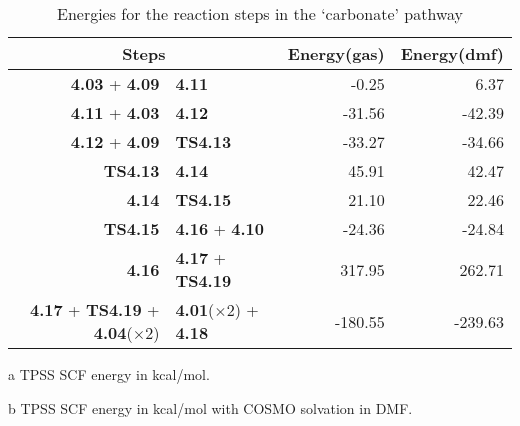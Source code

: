 \begin{table}[!htb]
\centering
 \begin{threeparttable}
  \caption{Energies for the reaction steps in the `carbonate' pathway}
    \begin{tabular}{r@{ $\rightarrow$ }lrr}
    \toprule
    \multicolumn{2}{c}{Steps} & Energy(gas)\tnote{a} & Energy(dmf)\tnote{b} \\
    \midrule
    \textbf{4.03} + \textbf{4.09} & \textbf{4.11} & -0.25 & 6.37 \\
    \textbf{4.11} + \textbf{4.03} & \textbf{4.12} & -31.56 & -42.39 \\
    \textbf{4.12} + \textbf{4.09} & \textbf{TS4.13} & -33.27 & -34.66 \\
    \textbf{TS4.13} & \textbf{4.14} & 45.91 & 42.47 \\
    \textbf{4.14} & \textbf{TS4.15} & 21.10 & 22.46 \\
    \textbf{TS4.15} & \textbf{4.16} + \textbf{4.10} & -24.36 & -24.84 \\
    \textbf{4.16} & \textbf{4.17} + \textbf{TS4.19} & 317.95 & 262.71 \\
    \textbf{4.17} + \textbf{TS4.19} + \textbf{4.04}($\times 2$) & \textbf{4.01}($\times 2$) + \textbf{4.18} & -180.55 & -239.63 \\
    \bottomrule
    \end{tabular}%
    \begin{tablenotes}
    \item [a] TPSS SCF energy in kcal/mol.
    \item [b] TPSS SCF energy in kcal/mol with COSMO solvation in DMF.
    \end{tablenotes}
  \label{tab.carbrxn}%
 \end{threeparttable}
\end{table}%
